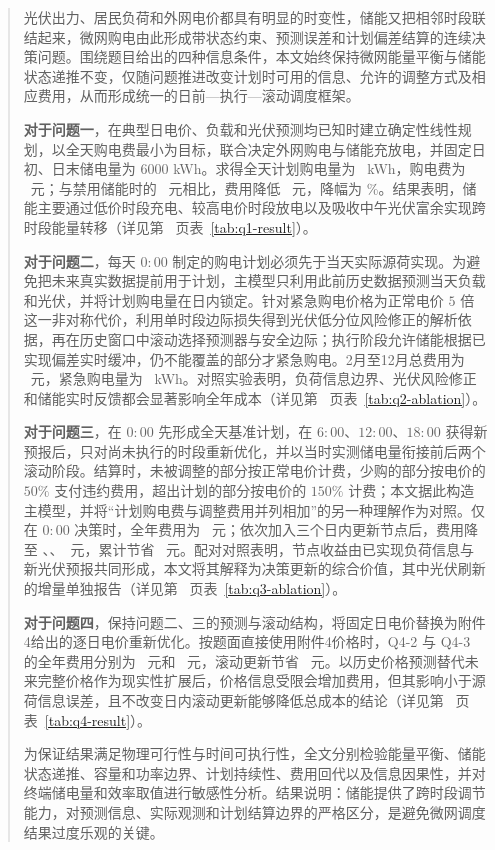 \maketitle
\thispagestyle{plain}
\begin{abstract}
\begingroup
\linespread{1.14}\selectfont

光伏出力、居民负荷和外网电价都具有明显的时变性，储能又把相邻时段联结起来，微网购电由此形成带状态约束、预测误差和计划偏差结算的连续决策问题。围绕题目给出的四种信息条件，本文始终保持微网能量平衡与储能状态递推不变，仅随问题推进改变计划时可用的信息、允许的调整方式及相应费用，从而形成统一的日前—执行—滚动调度框架。

\textbf{对于问题一}，在典型日电价、负载和光伏预测均已知时建立确定性线性规划，以全天购电费最小为目标，联合决定外网购电与储能充放电，并固定日初、日末储电量为 $6000$ kWh。求得全天计划购电量为 \QoneEnergy\ kWh，购电费为 \QoneCost\ 元；与禁用储能时的 \QoneNoStorage\ 元相比，费用降低 \QoneSave\ 元，降幅为 \QoneSavePct\%。结果表明，储能主要通过低价时段充电、较高电价时段放电以及吸收中午光伏富余实现跨时段能量转移（详见第~\pageref{tab:q1-result} 页表~\ref{tab:q1-result}）。

\textbf{对于问题二}，每天 $0{:}00$ 制定的购电计划必须先于当天实际源荷实现。为避免把未来真实数据提前用于计划，主模型只利用此前历史数据预测当天负载和光伏，并将计划购电量在日内锁定。针对紧急购电价格为正常电价 $5$ 倍这一非对称代价，利用单时段边际损失得到光伏低分位风险修正的解析依据，再在历史窗口中滚动选择预测器与安全边际；执行阶段允许储能根据已实现偏差实时缓冲，仍不能覆盖的部分才紧急购电。2月至12月总费用为 \QtwoTotal\ 元，紧急购电量为 \QtwoEmergency\ kWh。对照实验表明，负荷信息边界、光伏风险修正和储能实时反馈都会显著影响全年成本（详见第~\pageref{tab:q2-ablation} 页表~\ref{tab:q2-ablation}）。

\textbf{对于问题三}，在 $0{:}00$ 先形成全天基准计划，在 $6{:}00$、$12{:}00$、$18{:}00$ 获得新预报后，只对尚未执行的时段重新优化，并以当时实测储电量衔接前后两个滚动阶段。结算时，未被调整的部分按正常电价计费，少购的部分按电价的 $50\%$ 支付违约费用，超出计划的部分按电价的 $150\%$ 计费；本文据此构造主模型，并将“计划购电费与调整费用并列相加”的另一种理解作为对照。仅在 $0{:}00$ 决策时，全年费用为 \QthreeSzero\ 元；依次加入三个日内更新节点后，费用降至 \QthreeSone、\QthreeStwo、\QthreeSthree\ 元，累计节省 \QthreeVtotal\ 元。配对对照表明，节点收益由已实现负荷信息与新光伏预报共同形成，本文将其解释为决策更新的综合价值，其中光伏刷新的增量单独报告（详见第~\pageref{tab:q3-ablation} 页表~\ref{tab:q3-ablation}）。

\textbf{对于问题四}，保持问题二、三的预测与滚动结构，将固定日电价替换为附件4给出的逐日电价重新优化。按题面直接使用附件4价格时，Q4-2 与 Q4-3 的全年费用分别为 \QfourTwoMain\ 元和 \QfourThreeMain\ 元，滚动更新节省 \QfourRollPerfect\ 元。以历史价格预测替代未来完整价格作为现实性扩展后，价格信息受限会增加费用，但其影响小于源荷信息误差，且不改变日内滚动更新能够降低总成本的结论（详见第~\pageref{tab:q4-result} 页表~\ref{tab:q4-result}）。

为保证结果满足物理可行性与时间可执行性，全文分别检验能量平衡、储能状态递推、容量和功率边界、计划持续性、费用回代以及信息因果性，并对终端储电量和效率取值进行敏感性分析。结果说明：储能提供了跨时段调节能力，对预测信息、实际观测和计划结算边界的严格区分，是避免微网调度结果过度乐观的关键。

\endgroup
\end{abstract}
